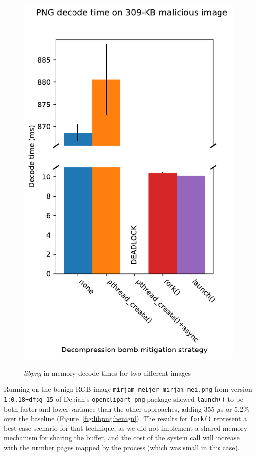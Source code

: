 \begin{figure}[t]
\begin{minipage}{\columnwidth}
	\includegraphics[width=\textwidth]{figs/cerberus2_nns16_surplus256k_10K}
	\label{fig:libpng:bomb}
	\end{minipage}
\caption{\textit{libpng} in-memory decode times for two different images}
\end{figure}

Running on the benign RGB image \texttt{mirjam\_meijer\_mirjam\_mei.png} from version
\texttt{1:0.18+dfsg-15} of Debian's \texttt{openclipart-png} package showed
\texttt{launch()} to be both faster and lower-variance than the other approaches,
adding 355 $\mu$s or 5.2\% over the baseline (Figure~\ref{fig:libpng:benign}).  The
results for \texttt{fork()} represent a best-case scenario for that technique, as we
did not implement a shared memory mechanism for sharing the buffer, and the cost of
the system call will increase with the number pages mapped by the process (which was
small in this case).

